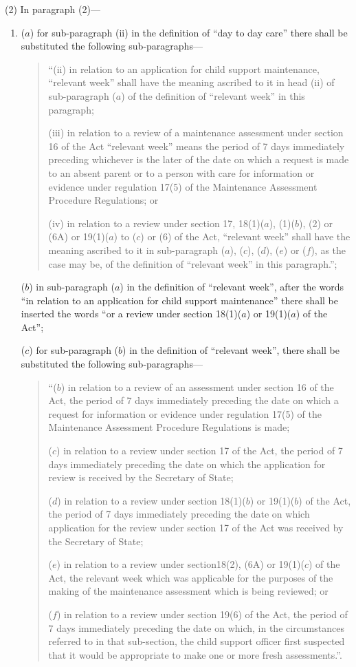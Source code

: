 \documentclass[a4paper]{article}
\begin{document}
(2) In paragraph (2)—
\begin{enumerate}\item[]
($a$) for sub-paragraph (ii) in the definition of “day to day care” there shall be substituted the following sub-paragraphs—
\begin{quotation}
“(ii) in relation to an application for child support maintenance, “relevant week” shall have the meaning ascribed to it in head (ii) of sub-paragraph ($a$) of the definition of “relevant week” in this paragraph;

(iii) in relation to a review of a maintenance assessment under section 16 of the Act “relevant week” means the period of 7 days immediately preceding whichever is the later of the date on which a request is made to an absent parent or to a person with care for information or evidence under regulation 17(5) of the Maintenance Assessment Procedure Regulations; or

(iv) in relation to a review under section 17, 18(1)($a$), (1)($b$), (2) or (6A) or 19(1)($a$) to ($c$) or (6) of the Act, “relevant week” shall have the meaning ascribed to it in sub-paragraph ($a$), ($c$), ($d$), ($e$) or ($f$), as the case may be, of the definition of “relevant week” in this paragraph.”;
\end{quotation}

($b$) in sub-paragraph ($a$) in the definition of “relevant week”, after the words “in relation to an application for child support maintenance” there shall be inserted the words “or a review under section 18(1)($a$) or 19(1)($a$) of the Act”;

($c$) for sub-paragraph ($b$) in the definition of “relevant week”, there shall be substituted the following sub-paragraphs—
\begin{quotation}
“($b$) in relation to a review of an assessment under section 16 of the Act, the period of 7 days immediately preceding the date on which a request for information or evidence under regulation 17(5) of the Maintenance Assessment Procedure Regulations is made;

($c$) in relation to a review under section 17 of the Act, the period of 7 days immediately preceding the date on which the application for review is received by the Secretary of State;

($d$) in relation to a review under section 18(1)($b$) or 19(1)($b$) of the Act, the period of 7 days immediately preceding the date on which application for the review under section 17 of the Act was received by the Secretary of State;

($e$) in relation to a review under section18(2), (6A) or 19(1)($c$) of the Act, the relevant week which was applicable for the purposes of the making of the maintenance assessment which is being reviewed; or

($f$) in relation to a review under section 19(6) of the Act, the period of 7 days immediately preceding the date on which, in the circumstances referred to in that sub-section, the child support officer first suspected that it would be appropriate to make one or more fresh assessments.”.
\end{quotation}
\end{enumerate}
\end{document}
